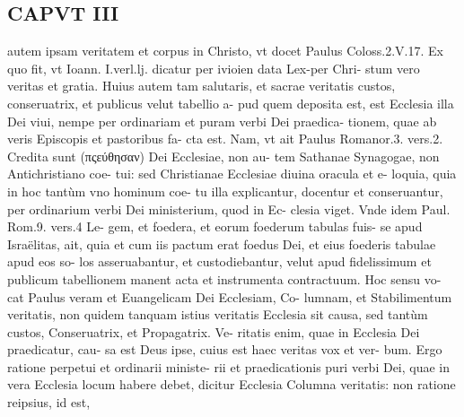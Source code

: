 \documentclass{article}
\begin{document}
\begin{pages}
\section*{CAPVT  III }
\marginpar{[ p.171 ]}\pstart autem ipsam veritatem et corpus in Christo, vt docet Paulus Coloss.2.V.17. Ex quo fit, vt Ioann. I.verl.lj. dicatur per ivioien data Lex-per Chri- stum vero veritas et gratia.  \pend\pstart Huius autem tam salutaris, et sacrae veritatis custos, conseruatrix, et publicus velut tabellio a- pud quem deposita est, est Ecclesia illa Dei viui, nempe per ordinariam et puram verbi Dei praedica- tionem, quae ab veris Episcopis et pastoribus fa- cta est. Nam, vt ait Paulus Romanor.3. vers.2. Credita sunt (πςεύθησαν) Dei Ecclesiae, non au- tem Sathanae Synagogae, non Antichristiano coe- tui: sed Christianae Ecclesiae diuina oracula et e- loquia, quia in hoc tantùm vno hominum coe- tu illa explicantur, docentur et conseruantur, per ordinarium verbi Dei ministerium, quod in Ec- clesia viget. Vnde idem Paul. Rom.9. vers.4 Le- gem, et foedera, et eorum foederum tabulas fuis- se apud Israëlitas, ait, quia et cum iis pactum erat foedus Dei, et eius foederis tabulae apud eos so- los asseruabantur, et custodiebantur, velut apud fidelissimum et publicum tabellionem manent acta et instrumenta contractuum. Hoc sensu vo- cat Paulus veram et Euangelicam Dei Ecclesiam, Co- lumnam, et Stabilimentum veritatis, non quidem tanquam istius veritatis Ecclesia sit causa, sed tantùm custos, Conseruatrix, et Propagatrix. Ve- ritatis enim, quae in Ecclesia Dei praedicatur, cau- sa est Deus ipse, cuius est haec veritas vox et ver- bum. Ergo ratione perpetui et ordinarii ministe- rii et praedicationis puri verbi Dei, quae in vera Ecclesia locum habere debet, dicitur Ecclesia Columna veritatis: non ratione reipsius, id est,  \pend

\end{pages}
\end{document}
